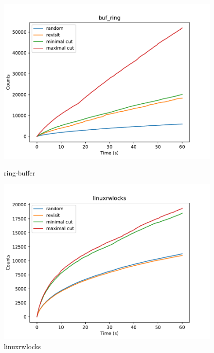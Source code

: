 \begin{figure}[h!]

	\centering
	\begin{minipage}{0.45\textwidth}
		\centering
		\includegraphics[width=\textwidth]{figure/genmc-time/buf_ring.pdf}
		\caption{ring-buffer}
		\label{genmc:buf_ring-time}
	\end{minipage}
	\hfill
	\begin{minipage}{0.45\textwidth}
		\centering
		\includegraphics[width=\textwidth]{figure/genmc-time/linuxrwlocks.pdf}
		\caption{linuxrwlocks}
		\label{genmc:linuxrwlocks-time}
	\end{minipage}

	\vspace{0.5cm}


\end{figure}
